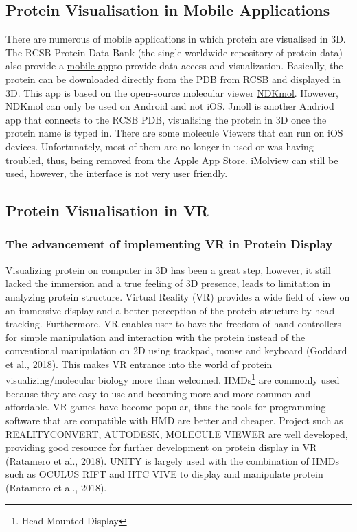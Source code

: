  \subsection{Protein Visualisation in Mobile Applications}

There are numerous of mobile applications in which protein are visualised in 3D. The RCSB Protein Data Bank (the single worldwide repository of protein data) also provide a \href{https://www.ncbi.nlm.nih.gov/pmc/articles/PMC4271143/}{mobile app}to provide data access and visualization. Basically, the protein can be downloaded directly from the PDB from RCSB and displayed in 3D. This app is based on the open-source molecular viewer \href{https://play.google.com/store/apps/details?id=jp.sfjp.webglmol.NDKmol&hl=en}{NDKmol}. However, NDKmol can only be used on Android and not iOS. \href{https://www.imedicalapps.com/2013/08/jmol-molecular-visualization-app/}{Jmol}l is another Andriod app that connects to the RCSB PDB, visualising the protein in 3D once the protein name is typed in.
There are some molecule Viewers that can run on iOS devices. Unfortunately, most of them are no longer in used or was having troubled, thus, being removed from the Apple App Store. \href{https://www.molsoft.com/iMolview.html}{iMolview} can still be used, however, the interface is not very user friendly. 


\subsection{Protein Visualisation in VR}
\subsubsection{The advancement of implementing VR in Protein Display}
Visualizing protein on computer in 3D has been a great step, however, it still lacked the immersion and a true feeling of 3D presence, leads to limitation in analyzing protein structure. Virtual Reality (VR) provides a wide field of view on an immersive display and a better perception of the protein structure by head-tracking. Furthermore, VR enables user to have the freedom of hand controllers for simple manipulation and interaction with the protein instead of the conventional manipulation on 2D using trackpad, mouse and keyboard (Goddard et al., 2018). This makes VR entrance into the world of protein visualizing/molecular biology more than welcomed. 
HMDs\footnote{Head Mounted Display} are commonly used because they are easy to use and becoming more and more common and affordable. VR games have become popular, thus the tools for programming software that are compatible with HMD are better and cheaper. Project such as {\footnotesize REALITYCONVERT}, {\footnotesize AUTODESK}, {\footnotesize MOLECULE VIEWER} are well developed, providing good resource for further development on protein display in VR (Ratamero et al., 2018). {\footnotesize UNITY} is largely used with the combination of HMDs such as {\footnotesize OCULUS RIFT} and {\footnotesize HTC VIVE} to display and manipulate protein (Ratamero et al., 2018).

